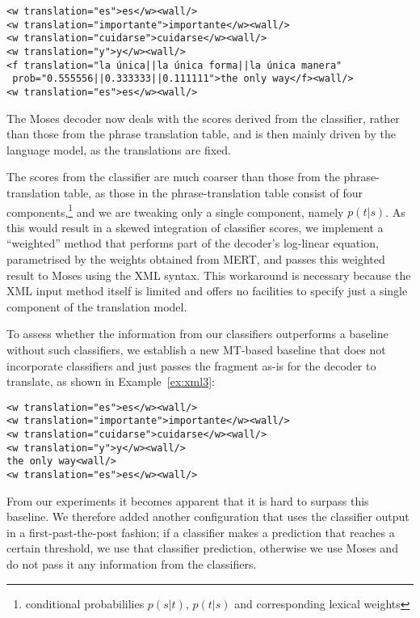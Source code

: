 \begin{exmp}

\label{ex:xml2}
\begin{lstlisting}
<w translation="es">es</w><wall/>
<w translation="importante">importante</w><wall/>
<w translation="cuidarse">cuidarse</w><wall/>
<w translation="y">y</w><wall/>
<f translation="la única||la única forma||la única manera"
 prob="0.555556||0.333333||0.111111">the only way</f><wall/>
<w translation="es">es</w><wall/>
\end{lstlisting}
\end{exmp}

The Moses decoder now deals with the scores derived from the classifier, rather
than those from the phrase translation table, and is then mainly driven by
the language model, as the translations are fixed.

The scores from the classifier are much coarser than those from the
phrase-translation table, as those in the phrase-translation table consist of
four components,\footnote{conditional probabililies $p(s|t)$, $p(t|s)$ and
corresponding lexical weights} and we are tweaking only a single component,
namely $p(t|s)$. As this would result in a skewed integration of classifier
scores, we implement a ``weighted'' method that performs part of the decoder's
log-linear equation, parametrised by the weights obtained from MERT, and passes
this weighted result to Moses using the XML syntax. This workaround is
necessary because the XML input method itself is limited and offers no
facilities to specify just a single component of the translation model.

To assess whether the information from our classifiers outperforms a baseline
without such classifiers, we establish a new MT-based baseline that does not
incorporate classifiers and just passes the fragment as-is for the decoder to
translate, as shown in Example~\ref{ex:xml3}:

\begin{exmp}
\label{ex:xml3}
\begin{lstlisting}
<w translation="es">es</w><wall/>
<w translation="importante">importante</w><wall/>
<w translation="cuidarse">cuidarse</w><wall/>
<w translation="y">y</w><wall/>
the only way<wall/>
<w translation="es">es</w><wall/>
\end{lstlisting}
\end{exmp}

From our experiments it becomes apparent that it is hard to surpass
this baseline. We therefore added another configuration that uses the
classifier output in a first-past-the-post fashion; if a classifier makes a
prediction that reaches a certain threshold, we use that classifier prediction,
otherwise we use Moses and do not pass it any information from the classifiers.

